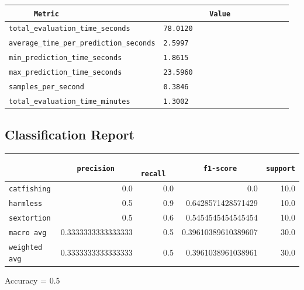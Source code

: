 \documentclass{article}
\begin{document}
\begin{center}
\begin{tabular}{l | l} \hline
    \verb|      Metric     | & \verb|           Value           | \\ \hline
    \hline
    \verb|total_evaluation_time_seconds| & \verb|78.0120                      | \\ \hline
    \verb|average_time_per_prediction_seconds| & \verb|2.5997                       | \\ \hline
    \verb|min_prediction_time_seconds| & \verb|1.8615                       | \\ \hline
    \verb|max_prediction_time_seconds| & \verb|23.5960                      | \\ \hline
    \verb|samples_per_second| & \verb|0.3846                       | \\ \hline
    \verb|total_evaluation_time_minutes| & \verb|1.3002                       | \\ \hline
\end{tabular}
\end{center}

\subsection{Classification Report}

\begin{center}
\begin{tabular}{l | r | r | r | r} \hline
    \verb|            | & \verb|    precision     | & \verb|      recall      | & \verb|     f1-score     | & \verb|support| \\ \hline
    \hline
    \verb|catfishing | & 0.0 & 0.0 & 0.0 &    10.0 \\ \hline
    \verb|harmless   | & 0.5 & 0.9 & 0.6428571428571429 &    10.0 \\ \hline
    \verb|sextortion | & 0.5 & 0.6 & 0.5454545454545454 &    10.0 \\ \hline
    \verb|macro avg  | & 0.3333333333333333 & 0.5 & 0.39610389610389607 &    30.0 \\ \hline
    \verb|weighted avg| & 0.3333333333333333 & 0.5 & 0.3961038961038961 &    30.0 \\ \hline
\end{tabular}
\end{center}

\begin{center}
Accuracy = 0.5
\end{center}
\end{document}
